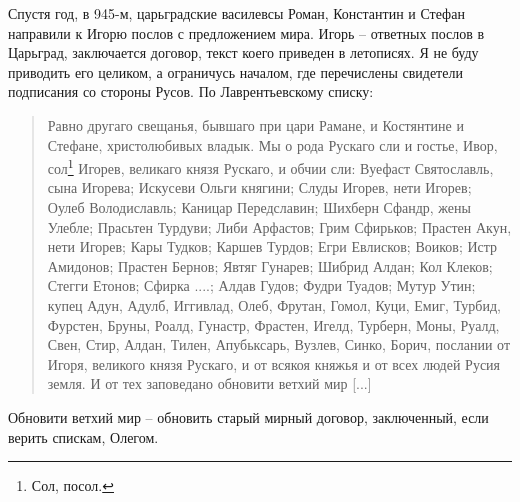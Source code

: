 Спустя год, в 945-м, царьградские василевсы Роман, Константин и Стефан направили к Игорю послов с предложением мира. Игорь – ответных послов в Царьград, заключается договор, текст коего приведен в летописях. Я не буду приводить его целиком, а ограничусь началом, где перечислены свидетели подписания со стороны Русов. По Лаврентьевскому списку:

\begin{quotation}
Равно другаго свещанья, бывшаго при цари Рамане, и Костянтине и Стефане, христолюбивых владык. Мы о рода Рускаго сли и гостье, Ивор, сол\footnote{Сол, посол.} Игорев, великаго князя Рускаго, и обчии сли: Вуефаст Святославль, сына Игорева; Искусеви Ольги княгини; Слуды Игорев, нети Игорев; Оулеб Володиславль; Каницар Передславин; Шихберн Сфандр, жены Улебле; Прасьтен Турдуви; Либи Арфастов; Грим Сфирьков; Прастен Акун, нети Игорев; Кары Тудков; Каршев Турдов; Егри Евлисков; Воиков; Истр Амидонов; Прастен Бернов; Явтяг Гунарев; Шибрид Алдан; Кол Клеков; Стегги Етонов; Сфирка ....; Алдав Гудов; Фудри Туадов; Мутур Утин; купец Адун, Адулб, Иггивлад, Олеб, Фрутан, Гомол, Куци, Емиг, Турбид, Фурстен, Бруны, Роалд, Гунастр, Фрастен, Игелд, Турберн, Моны, Руалд, Свен, Стир, Алдан, Тилен, Апубьксарь, Вузлев, Синко, Борич, послании от Игоря, великого князя Рускаго, и от всякоя княжья и от всех людей Русия земля. И от тех заповедано обновити ветхий мир [...]
\end{quotation}

Обновити ветхий мир – обновить старый мирный договор, заключенный, если верить спискам, Олегом.



